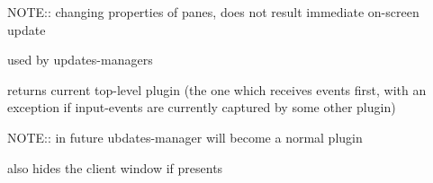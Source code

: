 
NOTE:: changing properties of panes, does not result immediate on-screen update


\label{wxframelayoutgetpanesarray}


used by updates-managers


\label{wxframelayoutgetparentframe}



\label{wxframelayoutgetprevclientrect}



\label{wxframelayoutgettopplugin}


returns current top-level plugin (the one which receives events first,
with an exception if input-events are currently captured by some other plugin)


\label{wxframelayoutgetupdatesmanager}


NOTE:: in future ubdates-manager will become a normal plugin


\label{wxframelayouthastopplugin}



\label{wxframelayouthidebarwindows}


also hides the client window if presents


\label{wxframelayouthittestpane}



\label{wxframelayouthittestpanes}



